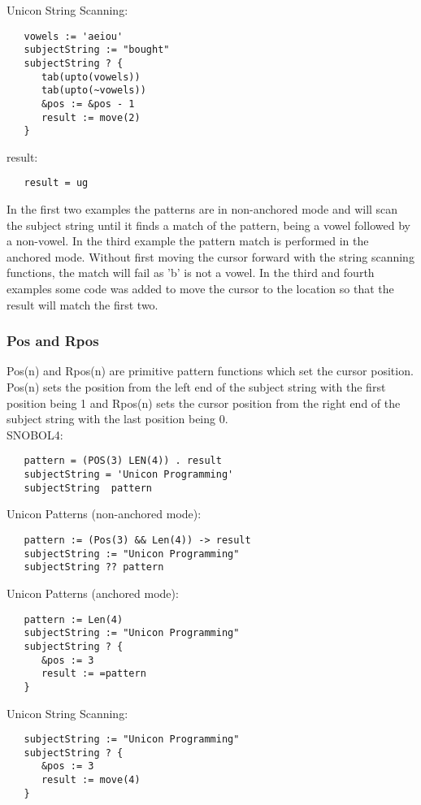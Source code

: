 \documentclass{article}
\begin{document}
\noindent
Unicon String Scanning:
\begin{verbatim}
   vowels := 'aeiou'
   subjectString := "bought"
   subjectString ? {
      tab(upto(vowels))
      tab(upto(~vowels))
      &pos := &pos - 1
      result := move(2)
   }
\end{verbatim}

\noindent
result:
\begin{verbatim}
   result = ug
\end{verbatim}

In the first two examples the patterns are in non-anchored mode and will scan the subject string until it finds a match of the pattern, being a vowel followed by a non-vowel.  In the third example the pattern match is performed in the anchored mode.  Without first moving the cursor forward with the string scanning functions, the match will fail as 'b' is not a vowel.  In the third and fourth examples some code was added to move the cursor to the location so that the result will match the first two.

\vspace{2 pc}
\subsubsection{Pos and Rpos}
Pos(n) and Rpos(n) are primitive pattern functions which set the cursor position.  Pos(n) sets the position from the left end of the subject string with the first position being 1 and Rpos(n) sets the cursor position from the right end of the subject string with the last position being 0.\\

\noindent
SNOBOL4:
\begin{verbatim}
   pattern = (POS(3) LEN(4)) . result
   subjectString = 'Unicon Programming'
   subjectString  pattern
\end{verbatim}

\noindent
Unicon Patterns (non-anchored mode):
\begin{verbatim}
   pattern := (Pos(3) && Len(4)) -> result
   subjectString := "Unicon Programming"
   subjectString ?? pattern
\end{verbatim}
\noindent
Unicon Patterns (anchored mode):
\begin{verbatim}
   pattern := Len(4)
   subjectString := "Unicon Programming"
   subjectString ? {
      &pos := 3
      result := =pattern
   }
\end{verbatim}

\noindent
Unicon String Scanning:
\begin{verbatim}
   subjectString := "Unicon Programming"
   subjectString ? {
      &pos := 3
      result := move(4)
   }
\end{verbatim}
\end{document}
